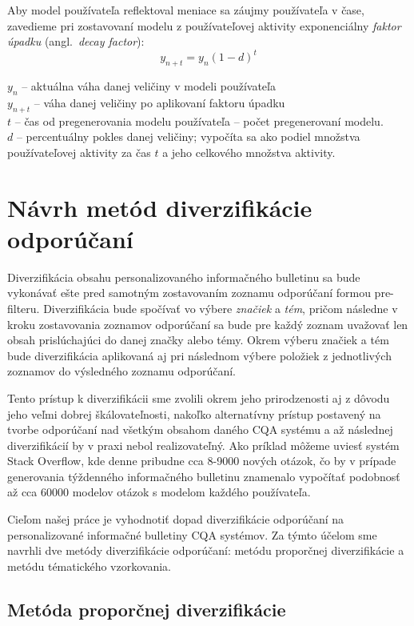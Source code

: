 Aby model používateľa reflektoval meniace sa záujmy používateľa v čase, zavedieme pri zostavovaní modelu z používateľovej
aktivity exponenciálny \textit{faktor úpadku} (angl.~\textit{decay factor}):
$$y_{n+t} = y_n (1 - d)^t$$

\begin{adjustwidth}{1cm}{1cm}
$y_n$ -- aktuálna váha danej veličiny v modeli používateľa\\
$y_{n+t}$ -- váha danej veličiny po aplikovaní faktoru úpadku\\
$t$ -- čas od pregenerovania modelu používateľa -- počet pregenerovaní modelu.\\
$d$ -- percentuálny pokles danej veličiny; vypočíta sa ako podiel množstva používateľovej aktivity za čas $t$ a jeho celkového množstva aktivity.
\end{adjustwidth}

\section{Návrh metód diverzifikácie odporúčaní}

Diverzifikácia obsahu personalizovaného informačného bulletinu sa bude vykonávať ešte pred samotným zostavovaním
zoznamu odporúčaní formou pre-filteru. Diverzifikácia bude spočívať vo výbere \textit{značiek} a \textit{tém}, pričom
následne v kroku zostavovania zoznamov odporúčaní sa bude pre každý zoznam uvažovať len obsah prislúchajúci do danej
značky alebo témy. Okrem výberu značiek a tém bude diverzifikácia aplikovaná aj pri následnom výbere položiek z jednotlivých
zoznamov do výsledného zoznamu odporúčaní.

Tento prístup k diverzifikácii sme zvolili okrem jeho prirodzenosti aj z dôvodu jeho veľmi dobrej škálovateľnosti,
nakoľko alternatívny prístup postavený na tvorbe odporúčaní nad všetkým obsahom daného CQA systému a až následnej
diverzifikácií by v praxi nebol realizovateľný. Ako príklad môžeme uviesť systém Stack Overflow, kde denne pribudne
cca 8-9000 nových otázok, čo by v prípade generovania týždenného informačného bulletinu znamenalo vypočítať podobnosť
až cca 60000 modelov otázok s modelom každého používateľa.

Cieľom našej práce je vyhodnotiť dopad diverzifikácie odporúčaní na personalizované informačné bulletiny CQA systémov.
Za týmto účelom sme navrhli dve metódy diverzifikácie odporúčaní: metódu proporčnej diverzifikácie a metódu tématického vzorkovania.

\subsection{Metóda proporčnej diverzifikácie}

